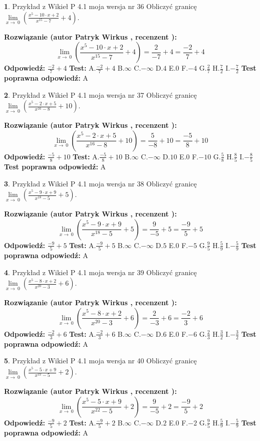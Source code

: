 \documentclass[12pt, a4paper]{article}
\theoremstyle{definition} %
\newtheorem{zad}{}
\newcommand{\zadStart}[1]{\begin{zad}#1\newline}
\newcommand{\zadStop}{\end{zad}}
\newcommand{\rozwStart}[2]{\noindent \textbf{Rozwiązanie (autor #1 , recenzent #2): }\newline}
\newcommand{\rozwStop}{\newline}
\newcommand{\odpStart}{\noindent \textbf{Odpowiedź:}\newline}
\newcommand{\odpStop}{\newline}
\newcommand{\testStart}{\noindent \textbf{Test:}\newline}
\newcommand{\testStop}{\newline}
\newcommand{\kluczStart}{\noindent \textbf{Test poprawna odpowiedź:}\newline}
\newcommand{\kluczStop}{\newline}
\begin{document}
\zadStart{Przykład z Wikieł P 4.1 moja wersja nr 36}
Obliczyć granicę $\lim\limits_{x\to\ 0}(\frac{x^{5}-10 \cdot x +2}{x^{15}-7}+4)$.
\zadStop
\rozwStart{Patryk Wirkus}{}
$$\lim\limits_{x\to\ 0}(\frac{x^{5}-10 \cdot x +2}{x^{15}-7}+4)=\frac{2}{-7}+4=\frac{-2}{7}+4$$
\rozwStop
\odpStart
$\frac{-2}{7}+4$
\odpStop
\testStart
A.$\frac{-2}{7}+4$
B.$\infty$
C.$-\infty$
D.$4$
E.$0$
F.$-4$
G.$\frac{2}{7}$
H.$\frac{7}{2}$
I.$-\frac{7}{2}$
\testStop
\kluczStart
A
\kluczStop



\zadStart{Przykład z Wikieł P 4.1 moja wersja nr 37}
Obliczyć granicę $\lim\limits_{x\to\ 0}(\frac{x^{5}-2 \cdot x +5}{x^{16}-8}+10)$.
\zadStop
\rozwStart{Patryk Wirkus}{}
$$\lim\limits_{x\to\ 0}(\frac{x^{5}-2 \cdot x +5}{x^{16}-8}+10)=\frac{5}{-8}+10=\frac{-5}{8}+10$$
\rozwStop
\odpStart
$\frac{-5}{8}+10$
\odpStop
\testStart
A.$\frac{-5}{8}+10$
B.$\infty$
C.$-\infty$
D.$10$
E.$0$
F.$-10$
G.$\frac{5}{8}$
H.$\frac{8}{5}$
I.$-\frac{8}{5}$
\testStop
\kluczStart
A
\kluczStop



\zadStart{Przykład z Wikieł P 4.1 moja wersja nr 38}
Obliczyć granicę $\lim\limits_{x\to\ 0}(\frac{x^{5}-9 \cdot x +9}{x^{18}-5}+5)$.
\zadStop
\rozwStart{Patryk Wirkus}{}
$$\lim\limits_{x\to\ 0}(\frac{x^{5}-9 \cdot x +9}{x^{18}-5}+5)=\frac{9}{-5}+5=\frac{-9}{5}+5$$
\rozwStop
\odpStart
$\frac{-9}{5}+5$
\odpStop
\testStart
A.$\frac{-9}{5}+5$
B.$\infty$
C.$-\infty$
D.$5$
E.$0$
F.$-5$
G.$\frac{9}{5}$
H.$\frac{5}{9}$
I.$-\frac{5}{9}$
\testStop
\kluczStart
A
\kluczStop



\zadStart{Przykład z Wikieł P 4.1 moja wersja nr 39}
Obliczyć granicę $\lim\limits_{x\to\ 0}(\frac{x^{5}-8 \cdot x +2}{x^{20}-3}+6)$.
\zadStop
\rozwStart{Patryk Wirkus}{}
$$\lim\limits_{x\to\ 0}(\frac{x^{5}-8 \cdot x +2}{x^{20}-3}+6)=\frac{2}{-3}+6=\frac{-2}{3}+6$$
\rozwStop
\odpStart
$\frac{-2}{3}+6$
\odpStop
\testStart
A.$\frac{-2}{3}+6$
B.$\infty$
C.$-\infty$
D.$6$
E.$0$
F.$-6$
G.$\frac{2}{3}$
H.$\frac{3}{2}$
I.$-\frac{3}{2}$
\testStop
\kluczStart
A
\kluczStop



\zadStart{Przykład z Wikieł P 4.1 moja wersja nr 40}
Obliczyć granicę $\lim\limits_{x\to\ 0}(\frac{x^{5}-5 \cdot x +9}{x^{22}-5}+2)$.
\zadStop
\rozwStart{Patryk Wirkus}{}
$$\lim\limits_{x\to\ 0}(\frac{x^{5}-5 \cdot x +9}{x^{22}-5}+2)=\frac{9}{-5}+2=\frac{-9}{5}+2$$
\rozwStop
\odpStart
$\frac{-9}{5}+2$
\odpStop
\testStart
A.$\frac{-9}{5}+2$
B.$\infty$
C.$-\infty$
D.$2$
E.$0$
F.$-2$
G.$\frac{9}{5}$
H.$\frac{5}{9}$
I.$-\frac{5}{9}$
\testStop
\kluczStart
A
\kluczStop
\end{document}
